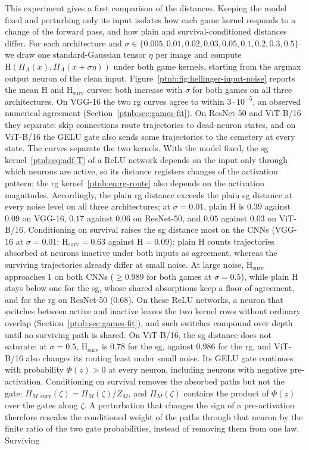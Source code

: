 This experiment gives a first comparison of the distances. Keeping the model fixed and perturbing only its input isolates how each game kernel responds to a change of the forward pass, and how plain and survival-conditioned distances differ. For each architecture and $\sigma \in \{0.005,\allowbreak 0.01,\allowbreak 0.02,\allowbreak 0.03,
    \allowbreak 0.05,\allowbreak 0.1,\allowbreak 0.2,\allowbreak 0.3,\allowbreak 0.5\}$ we draw one standard-Gaussian tensor $\eta$ per image and compute $\mathrm{H}(\Pi_A(x), \Pi_A(x + \sigma\eta))$ under both game kernels, starting from the argmax output neuron of the clean input. Figure~\ref{ptnb:fig:hellinger-input-noise} reports the mean $\mathrm{H}$ and $\mathrm{H}_{\mathrm{surv}}$ curves; both increase with $\sigma$ for both games on all three architectures. On VGG-16 the two \ac{rg} curves agree to within $3\cdot10^{-5}$, an observed numerical agreement (Section~\ref{ptnb:sec:games-fit}). On ResNet-50 and ViT-B/16 they separate: skip connections route trajectories to dead-neuron states, and on ViT-B/16 the GELU gate also sends some trajectories to the cemetery at every state. The curves separate the two kernels. With the model fixed, the \ac{sg} kernel~\eqref{ptnb:eq:adf-T} of a ReLU network depends on the input only through which neurons are active, so its distance registers changes of the activation pattern; the \ac{rg} kernel~\eqref{ptnb:eq:rg-route} also depends on the activation magnitudes. Accordingly, the plain \ac{rg} distance exceeds the plain \ac{sg} distance at every noise level on all three architectures; at $\sigma=0.01$, plain $\mathrm H$ is $0.39$ against $0.09$ on VGG-16, $0.17$ against $0.06$ on ResNet-50, and $0.05$ against $0.03$ on ViT-B/16. Conditioning on survival raises the \ac{sg} distance most on the CNNs (VGG-16 at $\sigma=0.01$: $\mathrm H_{\mathrm{surv}}=0.63$ against $\mathrm H=0.09$): plain $\mathrm H$ counts trajectories absorbed at neurons inactive under both inputs as agreement, whereas the surviving trajectories already differ at small noise. At large noise, $\mathrm H_{\mathrm{surv}}$ approaches $1$ on both CNNs ($\ge0.989$ for both games at $\sigma=0.5$), while plain $\mathrm H$ stays below one for the \ac{sg}, whose shared absorptions keep a floor of agreement, and for the \ac{rg} on ResNet-50 ($0.68$). On these ReLU networks, a neuron that switches between active and inactive leaves the two kernel rows without ordinary overlap (Section~\ref{ptnb:sec:games-fit}), and such switches compound over depth until no surviving path is shared. On ViT-B/16, the \ac{sg} distance does not saturate: at $\sigma=0.5$, $\mathrm H_{\mathrm{surv}}$ is $0.78$ for the \ac{sg}, against $0.986$ for the \ac{rg}, and ViT-B/16 also changes its routing least under small noise. Its GELU gate continues with probability $\Phi(z)>0$ at every neuron, including neurons with negative pre-activation. Conditioning on survival removes the absorbed paths but not the gate: $\Pi_{M,\mathrm{surv}}(\zeta)=\Pi_M(\zeta)/Z_M$, and $\Pi_M(\zeta)$ contains the product of $\Phi(z)$ over the gates along $\zeta$. A perturbation that changes the sign of a pre-activation therefore rescales the conditioned weight of the paths through that neuron by the finite ratio of the two gate probabilities, instead of removing them from one law. Surviving 